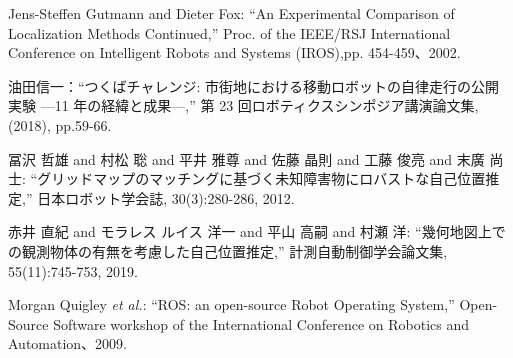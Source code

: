 \documentclass{jarticle}
\begin{document}
\footnotesize
\begin{thebibliography}{99}

  Jens-Steffen Gutmann and Dieter Fox: 
  ``An Experimental Comparison of Localization Methods Continued,''
  Proc. of the IEEE/RSJ International Conference on Intelligent Robots and Systems (IROS),pp. 454-459、2002.

  油田信一：“つくばチャレンジ: 市街地における移動ロボットの自律走行の公開実験 —11 年の経緯と成果—,''
  第 23 回ロボティクスシンポジア講演論文集, (2018), pp.59-66.
  
  冨沢 哲雄 and 村松 聡 and 平井 雅尊 and 佐藤 晶則 and 工藤 俊亮 and 末廣 尚士:
  ``グリッドマップのマッチングに基づく未知障害物にロバストな自己位置推定,'' 日本ロボット学会誌, 30(3):280-286, 2012.
  
  赤井 直紀 and モラレス ルイス 洋一 and 平山 高嗣 and 村瀬 洋:
  ``幾何地図上での観測物体の有無を考慮した自己位置推定,'' 計測自動制御学会論文集, 55(11):745-753, 2019.
  
	Morgan Quigley {\it et al.}: ``ROS: an open-source Robot Operating System,'' 
  Open-Source Software workshop of the International Conference on Robotics and Automation、2009. 

\end{thebibliography}

\normalsize
\end{document}
